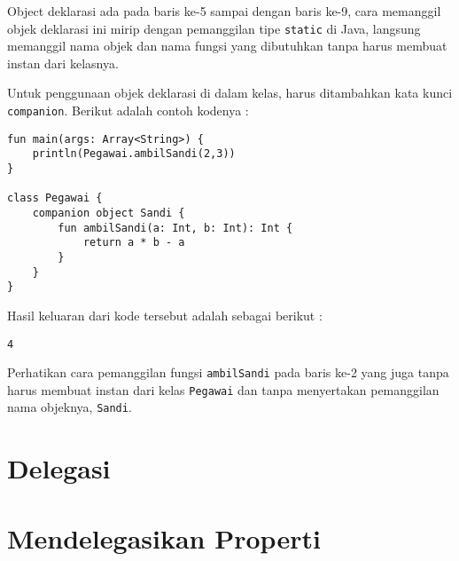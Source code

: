 Object deklarasi ada pada baris ke-5 sampai dengan baris ke-9, cara memanggil objek deklarasi ini mirip dengan pemanggilan tipe \texttt{static} di Java, langsung memanggil nama objek dan nama fungsi yang dibutuhkan tanpa harus membuat instan dari kelasnya.

Untuk penggunaan objek deklarasi di dalam kelas, harus ditambahkan kata kunci \texttt{companion}. Berikut adalah contoh kodenya :

\begin{lstlisting}
fun main(args: Array<String>) {
	println(Pegawai.ambilSandi(2,3))
}

class Pegawai {
	companion object Sandi {
		fun ambilSandi(a: Int, b: Int): Int {
			return a * b - a
		}
	}
}
\end{lstlisting}

Hasil keluaran dari kode tersebut adalah sebagai berikut :

\begin{lstlisting}
4
\end{lstlisting}

Perhatikan cara pemanggilan fungsi \texttt{ambilSandi} pada baris ke-2 yang juga tanpa harus membuat instan dari kelas \texttt{Pegawai} dan tanpa menyertakan pemanggilan nama objeknya, \texttt{Sandi}.

\section{Delegasi}

\section{Mendelegasikan Properti}